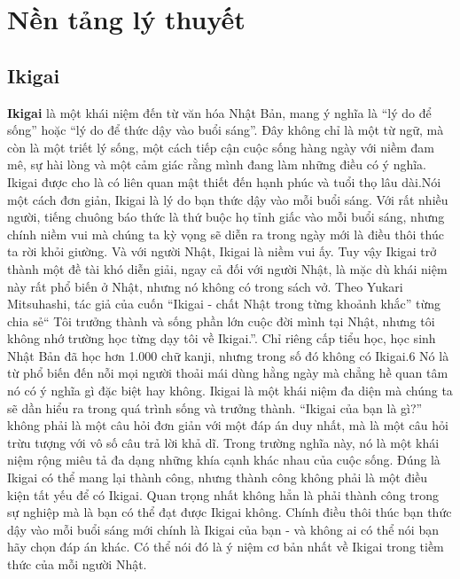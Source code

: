 \section{Nền tảng lý thuyết}
\subsection{Ikigai}
\textbf{Ikigai} là một khái niệm đến từ văn hóa Nhật Bản, mang ý nghĩa là “lý do để sống” hoặc “lý do để thức dậy vào buổi sáng”. Đây không chỉ là một từ ngữ, mà còn là một triết lý sống, một cách tiếp cận cuộc sống hàng ngày với niềm đam mê, sự hài lòng và một cảm giác rằng mình đang làm những điều có ý nghĩa. Ikigai được cho là có liên quan mật thiết đến hạnh phúc và tuổi thọ lâu dài.Nói một cách đơn giản, Ikigai là lý do bạn thức dậy vào mỗi buổi sáng. Với rất nhiều người, tiếng chuông báo thức là thứ buộc họ tỉnh giấc vào mỗi buổi sáng, nhưng chính niềm vui mà chúng ta kỳ vọng sẽ diễn ra trong ngày mới là điều thôi thúc ta rời khỏi giường. Và với người Nhật, Ikigai là niềm vui ấy. Tuy vậy Ikigai trở thành một đề tài khó diễn giải, ngay cả đối với người Nhật, là mặc dù khái niệm này rất phổ biến ở Nhật, nhưng nó không có trong sách vở. Theo Yukari Mitsuhashi, tác giả của cuốn “Ikigai - chất Nhật trong từng khoảnh khắc” từng chia sẻ“ Tôi trưởng thành và sống phần lớn cuộc đời mình tại Nhật, nhưng tôi không nhớ trường học từng dạy tôi về Ikigai.”. Chỉ riêng cấp tiểu học, học sinh Nhật Bản đã học hơn 1.000 chữ kanji, nhưng trong số đó không có Ikigai.6 Nó là từ phổ biến đến nỗi mọi người thoải mái dùng hằng ngày mà chẳng hề quan tâm nó có ý nghĩa gì đặc biệt hay không. Ikigai là một khái niệm đa diện mà chúng ta sẽ dần hiểu ra trong quá trình sống và trưởng thành. “Ikigai của bạn là gì?” không phải là một câu hỏi đơn giản với một đáp án duy nhất, mà là một câu hỏi trừu tượng với vô số câu trả lời khả dĩ. Trong trường nghĩa này, nó là một khái niệm rộng miêu tả đa dạng những khía cạnh khác
nhau của cuộc sống. Đúng là Ikigai có thể mang lại thành công, nhưng thành công
không phải là một điều kiện tất yếu để có Ikigai. Quan trọng nhất không hẳn là phải
thành công trong sự nghiệp mà là bạn có thể đạt được Ikigai không. Chính điều thôi
thúc bạn thức dậy vào mỗi buổi sáng mới chính là Ikigai của bạn - và không ai có thể
nói bạn hãy chọn đáp án khác. Có thể nói đó là ý niệm cơ bản nhất về Ikigai trong tiềm
thức của mỗi người Nhật.

